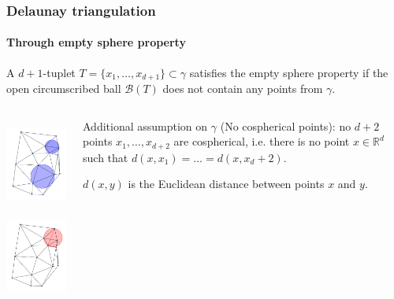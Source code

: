 \documentclass[c, 10pt]{beamer}
\begin{document}
\begin{frame}\frametitle{Delaunay triangulation}\framesubtitle{Through empty sphere property}
\begin{small}

A $d+1$-tuplet $T=\{x_1, \dots, x_{d+1}\} \subset \gamma$ satisfies the \alert{empty sphere property} if the open circumscribed ball $\mathcal B(T)$ does not contain any points from $\gamma$. 

\vspace{3mm}


\begin{minipage}[0.2\textheight]{\textwidth}
\begin{columns}[T]
\begin{column}{0.4\textwidth}
\begin{center}
\includegraphics[height = 3cm]{./FigureLayout/DelaunayGood.png}
\includegraphics[height = 3cm]{./FigureLayout/DelaunayBad.png}
\end{center}
\end{column}
\begin{column}{0.6\textwidth}
\vspace{10mm}

Additional assumption on $\gamma$ (\alert{No cospherical points}): no $d+2$ points $x_1, \dots, x_{d+2}$ are cospherical, i.e. there is no point $x\in \mathbb R^d$ such that $d(x,x_1)=\dots =d(x,x_d+2)$.\newline

$d(x,y)$ is the Euclidean distance between points $x$ and $y$.
\end{column}
\end{columns}
\end{minipage}

\end{small}
\end{frame}
\end{document}
